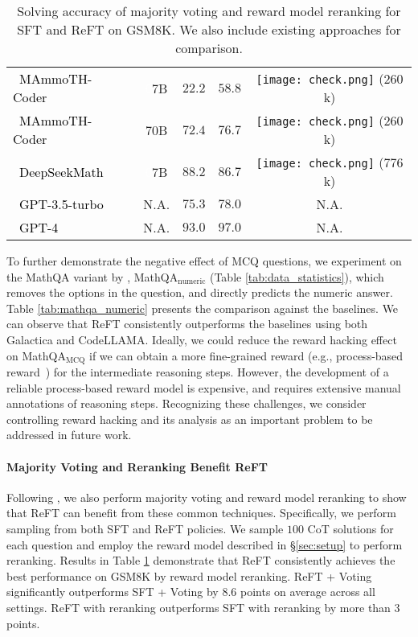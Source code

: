 \begin{table}[t!]
{\begin{tabular}{lcccc}
         \textcolor{black}{~MAmmoTH-Coder}~\cite{yue2023mammoth} & \textcolor{white}{0}7B & $22.2$ & $58.8$  & \texttt{[image: check.png]} ($260$k)\\
         \textcolor{black}{~MAmmoTH-Coder}~\cite{yue2023mammoth} & 70B & $72.4$ & $76.7$  & \texttt{[image: check.png]} ($260$k)\\
         \textcolor{black}{~DeepSeekMath}~\cite{shao2024deepseekmath} & \textcolor{white}{0}7B & $88.2$ & $86.7$ & \texttt{[image: check.png]} ($776$k)\\
         \midrule
         \midrule
         \textcolor{black}{~GPT-3.5-turbo~\cite{jie2023design}} & N.A. & $75.3$ & $78.0$& N.A.  \\
         \textcolor{black}{~GPT-4~\cite{openai2023gpt4, zhou2023solving}} & N.A. & $93.0$ & $97.0$  & N.A.\\
         \bottomrule
    \end{tabular}
    }
    \caption{Solving accuracy of majority voting and reward model reranking for SFT and ReFT on GSM8K. We also include existing approaches for comparison.}
    \label{tab:voting_reranking}
\end{table}

To further demonstrate the negative effect of MCQ questions, we experiment on the MathQA variant by \citet{jie2023leveraging}, MathQA$_\text{numeric}$ (Table \ref{tab:data_statistics}), which removes the options in the question, and directly predicts the numeric answer. 
Table \ref{tab:mathqa_numeric} presents the comparison against the baselines. 
We can observe that ReFT consistently outperforms the baselines using both Galactica and CodeLLAMA. 
Ideally, we could reduce the reward hacking effect on MathQA$_\text{MCQ}$ if we can obtain a more fine-grained reward (e.g., process-based reward~\cite{lightman2023lets}) for the intermediate reasoning steps. 
However, the development of a reliable process-based reward model is expensive, and requires extensive manual annotations of reasoning steps. 
Recognizing these challenges, we consider controlling reward hacking and its analysis as an important problem to be addressed in future work.

\paragraph{Majority Voting and Reranking Benefit ReFT}
Following \citet{wang2022self,uesato2022solving,lightman2023lets}, we also perform majority voting and reward model reranking to show that ReFT can benefit from these common techniques. 
Specifically, we perform sampling from both SFT and ReFT policies. 
We sample $100$ CoT solutions for each question and employ the reward model described in \S\ref{sec:setup} to perform reranking. 
Results in Table \ref{tab:voting_reranking} demonstrate that ReFT consistently achieves the best performance on GSM8K by reward model reranking. 
ReFT + Voting significantly outperforms SFT + Voting by $8.6$ points on average across all settings.
ReFT with reranking outperforms SFT with reranking by more than $3$ points.

